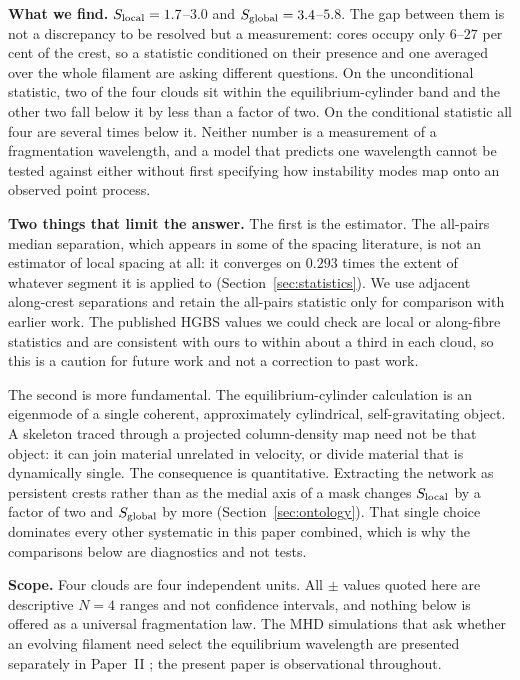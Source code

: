 \documentclass[usenatbib,twoside,twocolumn]{mnras}
\begin{document}
\smallskip\noindent\textbf{What we find.} $S_{\rm local}=1.7$--$3.0$ and $S_{\rm global}=3.4$--$5.8$. The gap between them is not a discrepancy to be resolved but a measurement: cores occupy only $6$--$27$ per cent of the crest, so a statistic conditioned on their presence and one averaged over the whole filament are asking different questions. On the unconditional statistic, two of the four clouds sit within the equilibrium-cylinder band and the other two fall below it by less than a factor of two. On the conditional statistic all four are several times below it. Neither number is a measurement of a fragmentation wavelength, and a model that predicts one wavelength cannot be tested against either without first specifying how instability modes map onto an observed point process.

\smallskip\noindent\textbf{Two things that limit the answer.} The first is the estimator. The all-pairs median separation, which appears in some of the spacing literature, is not an estimator of local spacing at all: it converges on $0.293$ times the extent of whatever segment it is applied to (Section~\ref{sec:statistics}). We use adjacent along-crest separations and retain the all-pairs statistic only for comparison with earlier work. The published HGBS values we could check are local or along-fibre statistics and are consistent with ours to within about a third in each cloud, so this is a caution for future work and not a correction to past work.

The second is more fundamental. The equilibrium-cylinder calculation is an eigenmode of a single coherent, approximately cylindrical, self-gravitating object. A skeleton traced through a projected column-density map need not be that object: it can join material unrelated in velocity, or divide material that is dynamically single. The consequence is quantitative. Extracting the network as persistent crests rather than as the medial axis of a mask changes $S_{\rm local}$ by a factor of two and $S_{\rm global}$ by more (Section~\ref{sec:ontology}). That single choice dominates every other systematic in this paper combined, which is why the comparisons below are diagnostics and not tests.

\smallskip\noindent\textbf{Scope.} Four clouds are four independent units. All $\pm$ values quoted here are descriptive $N=4$ ranges and not confidence intervals, and nothing below is offered as a universal fragmentation law. The MHD simulations that ask whether an evolving filament need select the equilibrium wavelength are presented separately in Paper~II \citep{PaperII}; the present paper is observational throughout.
\end{document}
